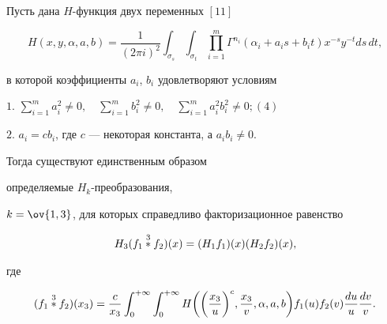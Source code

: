 \begin{thm} 


Пусть дана $H$-функция двух переменных $[11]$ 


\begin{equation} 


H(x,y,\alpha,a,b)=\frac{1}{(2\pi i)^2}\int_{\sigma_s} 


\int_{\sigma_t}\prod^m_{i=1}\Gamma^{n_i} 


(\alpha_i+a_i s+b_i t)x^{-s}y^{-t}ds\,dt, 


\end{equation} 


в которой коэффициенты $a_i$, $b_i$ удовлетворяют условиям 


\smallskip 


 


$1.$ \hfill $\displaystyle{\sum^m_{i=1}a^2_i\ne0,\quad 


\sum^m_{i=1}b^2_i\ne0,\quad \sum^m_{i=1}a^2_i b^2_i\ne0};$\hfill $(4)$ 


\smallskip \addtocounter{equation}{1}


 


$2.$ $a_i=c b_i$, где $c$ --- некоторая константа, а $a_i b_i\ne0$. 


 


\noindent{}Тогда существуют единственным образом 


определяемые $H_k$-преобразования, 


$k=\ov{1,3}$, для которых справедливо факторизационное равенство 


\begin{equation} 


H_3(f_1\up{3}{*}f_2)(x)=(H_1f_1)(x)(H_2f_2)(x), 


\end{equation} 


где 


$$ 


(f_1\up{3}{*}f_2)(x_3)=\frac{c}{x_3}\int^{+\infty}_0 


\int^{+\infty}_0 H\bigg(\bigg(\frac{x_3}{u} \bigg)^c, 


\frac{x_3}{v},\alpha,a,b\bigg)f_1(u)f_2(v) 


\frac{du}{u}\frac{dv}{v}. 


$$ 


\end{thm} 


